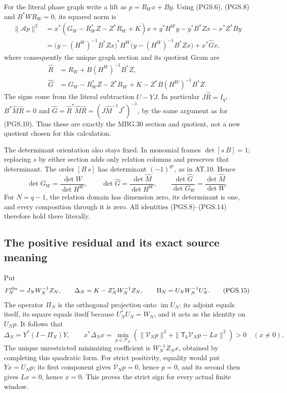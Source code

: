 For the literal phase graph write a lift as \(p=R_Wx+By\).
Using (PGS.6), (PGS.8) and \(B^*WR_W=0\), its squared norm is
\[
\begin{aligned}
 \|\mathcal A p\|^2
  &=x^*(G_W-R_W^*Z-Z^*R_W+K)x
    +y^*H^Wy-y^*B^*Zx-x^*Z^*By\\
  &=\bigl(y-(H^W)^{-1}B^*Zx\bigr)^*H^W
       \bigl(y-(H^W)^{-1}B^*Zx\bigr)
     +x^*\widehat Gx,
\end{aligned}
\tag{PGS.12}\label{GraphV2:eq:pgs-complete-square}
\]
where consequently the unique graph section and its quotient Gram are
\[
\boxed{\begin{aligned}
 \widehat R&=R_W+B(H^W)^{-1}B^*Z,\\
 \widehat G&=G_W-R_W^*Z-Z^*R_W+K
                    -Z^*B(H^W)^{-1}B^*Z.
\end{aligned}}
\tag{PGS.13}\label{GraphV2:eq:pgs-graph-section}
\]
The signs come from the literal subtraction \(U-YJ\). In particular
\(J\widehat R=I_q\),
\(B^*\widehat M\widehat R=0\) and
\(\widehat G=\widehat R^*\widehat M\widehat R
=(J\widehat M^{-1}J^*)^{-1}\), by the same argument as for
(PGS.10). Thus these are exactly the MBG.30 section and quotient,
not a new quotient chosen for this calculation.

The determinant orientation also stays fixed. In monomial frames
\(\det[s\ B]=1\); replacing \(s\) by either section adds only
relation columns and preserves that determinant. The order \([B\ s]\)
has determinant \((-1)^{qr}\), as in AT.10. Hence
\[
 \det G_W=\frac{\det W}{\det H^W},\qquad
 \det\widehat G=\frac{\det\widehat M}{\det H^W},\qquad
 \frac{\det\widehat G}{\det G_W}
      =\frac{\det\widehat M}{\det W}.
\tag{PGS.14}\label{GraphV2:eq:pgs-determinants}
\]
For \(N=q-1\), the relation domain has dimension zero, its
determinant is one, and every composition through it is zero.
All identities (PGS.8)--(PGS.14) therefore hold there literally.

\subsection{The positive residual and its exact source meaning}

Put
\[
 F_N^{\rm obs}=J_NW_N^{-1}Z_N,\qquad
 \Delta_N=K-Z_N^*W_N^{-1}Z_N,\qquad
 \Pi_N=U_NW_N^{-1}U_N^*.
\tag{PGS.15}\label{GraphV2:eq:pgs-residual-data}
\]
The operator \(\Pi_N\) is the orthogonal projection onto
\(\operatorname{im}U_N\): its adjoint equals itself, its square
equals itself because \(U_N^*U_N=W_N\), and it acts as the
identity on \(U_Np\). It follows that
\[
 \Delta_N=Y^*(I-\Pi_N)Y,\qquad
 x^*\Delta_Nx=\min_{p\in\mathcal P_N}
   \left(\|\mathcal V_Np\|^2+
       \|\mathsf T_k\mathcal V_Np-Lx\|^2\right)>0
       \quad(x\ne0).
\tag{PGS.16}\label{GraphV2:eq:pgs-residual-positive}
\]
The unique unrestricted minimizing coefficient is
\(W_N^{-1}Z_Nx\), obtained by completing this quadratic form.
For strict positivity, equality would put \(Yx=U_Np\); its first
component gives \(\mathcal V_Np=0\), hence \(p=0\), and its
second then gives \(Lx=0\), hence \(x=0\). This proves the strict
sign for every actual finite window.

